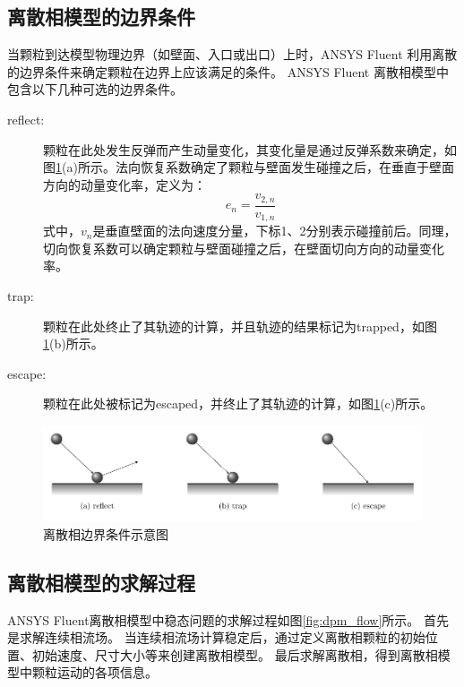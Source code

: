 \documentclass{ctexart}
\begin{document}
\subsection{离散相模型的边界条件}
当颗粒到达模型物理边界（如壁面、入口或出口）上时，ANSYS Fluent \textregistered 利用离散的边界条件来确定颗粒在边界上应该满足的条件。
ANSYS Fluent \textregistered 离散相模型中包含以下几种可选的边界条件。

\begin{description}
\item[reflect: ]
颗粒在此处发生反弹而产生动量变化，其变化量是通过反弹系数来确定，如图\ref{fig:bc}(a)所示。法向恢复系数确定了颗粒与壁面发生碰撞之后，在垂直于壁面方向的动量变化率，定义为：
\begin{equation}
e_n = \frac{v_{2,n}}{v_{1,n}}
\end{equation}
式中，$v_n$是垂直壁面的法向速度分量，下标1、2分别表示碰撞前后。同理，切向恢复系数可以确定颗粒与壁面碰撞之后，在壁面切向方向的动量变化率。

\item[trap: ] 颗粒在此处终止了其轨迹的计算，并且轨迹的结果标记为trapped，如图\ref{fig:bc}(b)所示。

\item[escape: ] 颗粒在此处被标记为escaped，并终止了其轨迹的计算，如图\ref{fig:bc}(c)所示。

\end{description}

\begin{figure}
\centering
\includegraphics{./fig/bc}
\caption{离散相边界条件示意图}
\label{fig:bc}
\end{figure}

\subsection{离散相模型的求解过程}
ANSYS Fluent\textregistered 离散相模型中稳态问题的求解过程如图\ref{fig:dpm_flow}所示。
首先是求解连续相流场。
当连续相流场计算稳定后，通过定义离散相颗粒的初始位置、初始速度、尺寸大小等来创建离散相模型。
最后求解离散相，得到离散相模型中颗粒运动的各项信息。
\end{document}
